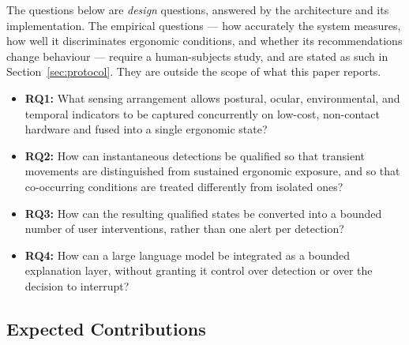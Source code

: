 The questions below are \emph{design} questions, answered by the architecture and its implementation. The empirical questions --- how accurately the system measures, how well it discriminates ergonomic conditions, and whether its recommendations change behaviour --- require a human-subjects study, and are stated as such in Section~\ref{sec:protocol}. They are outside the scope of what this paper reports.

\begin{itemize}
    \item \textbf{RQ1:} What sensing arrangement allows postural, ocular, environmental, and temporal indicators to be captured concurrently on low-cost, non-contact hardware and fused into a single ergonomic state?
    \item \textbf{RQ2:} How can instantaneous detections be qualified so that transient movements are distinguished from sustained ergonomic exposure, and so that co-occurring conditions are treated differently from isolated ones?
    \item \textbf{RQ3:} How can the resulting qualified states be converted into a bounded number of user interventions, rather than one alert per detection?
    \item \textbf{RQ4:} How can a large language model be integrated as a bounded explanation layer, without granting it control over detection or over the decision to interrupt?
\end{itemize}

\subsection{Expected Contributions}
\label{subsec:expected_contributions}

